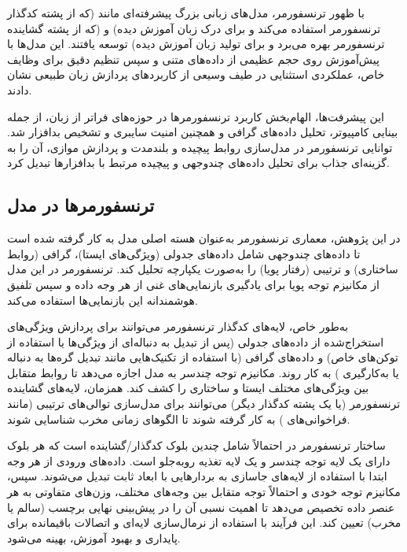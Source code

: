 با ظهور ترنسفورمر، مدل‌های زبانی بزرگ  پیشرفته‌ای مانند   (که از پشته کدگذار ترنسفورمر استفاده می‌کند و برای درک زبان آموزش دیده) و  (که از پشته گشاینده ترنسفورمر بهره می‌برد و برای تولید زبان آموزش دیده) توسعه یافتند. این مدل‌ها با پیش‌آموزش روی حجم عظیمی از داده‌های متنی و سپس تنظیم دقیق  برای وظایف خاص، عملکردی استثنایی در طیف وسیعی از کاربردهای پردازش زبان طبیعی نشان دادند.

این پیشرفت‌ها، الهام‌بخش کاربرد ترنسفورمرها در حوزه‌های فراتر از زبان، از جمله بینایی کامپیوتر، تحلیل داده‌های گرافی و همچنین امنیت سایبری و تشخیص بدافزار \cite{TransformerMalware} شد. توانایی ترنسفورمر در مدل‌سازی روابط پیچیده و بلندمدت و پردازش موازی، آن را به گزینه‌ای جذاب برای تحلیل داده‌های چندوجهی و پیچیده مرتبط با بدافزارها تبدیل کرد.

\subsection{ترنسفورمرها در مدل }
در این پژوهش، معماری ترنسفورمر به‌عنوان هسته اصلی مدل   به کار گرفته شده است تا داده‌های چندوجهی شامل داده‌های جدولی (ویژگی‌های ایستا)، گرافی (روابط ساختاری) و ترتیبی (رفتار پویا) را به‌صورت یکپارچه تحلیل کند. ترنسفورمر در این مدل از مکانیزم توجه پویا برای یادگیری بازنمایی‌های غنی  از هر وجه داده و سپس تلفیق  هوشمندانه این بازنمایی‌ها استفاده می‌کند.

به‌طور خاص، لایه‌های کدگذار ترنسفورمر می‌توانند برای پردازش ویژگی‌های استخراج‌شده از داده‌های جدولی (پس از تبدیل به دنباله‌ای از ویژگی‌ها یا استفاده از توکن‌های خاص) و داده‌های گرافی (با استفاده از تکنیک‌هایی مانند تبدیل گره‌ها به دنباله یا به‌کارگیری ) به کار روند. مکانیزم توجه چندسر به مدل اجازه می‌دهد تا روابط متقابل بین ویژگی‌های مختلف ایستا و ساختاری را کشف کند. همزمان، لایه‌های گشاینده ترنسفورمر (یا یک پشته کدگذار دیگر) می‌توانند برای مدل‌سازی توالی‌های ترتیبی (مانند فراخوانی‌های ) به کار گرفته شوند تا الگوهای زمانی مخرب شناسایی شوند.

ساختار ترنسفورمر در  احتمالاً شامل چندین بلوک کدگذار/گشاینده است که هر بلوک دارای یک لایه توجه چندسر و یک لایه تغذیه روبه‌جلو است. داده‌های ورودی از هر وجه ابتدا با استفاده از لایه‌های جاسازی به بردارهایی با ابعاد ثابت تبدیل می‌شوند. سپس، مکانیزم توجه خودی و احتمالاً توجه متقابل  بین وجه‌های مختلف، وزن‌های متفاوتی به هر عنصر داده تخصیص می‌دهد تا اهمیت نسبی آن را در پیش‌بینی نهایی برچسب (سالم یا مخرب) تعیین کند. این فرآیند با استفاده از نرمال‌سازی لایه‌ای و اتصالات باقیمانده برای پایداری و بهبود آموزش، بهینه می‌شود.

